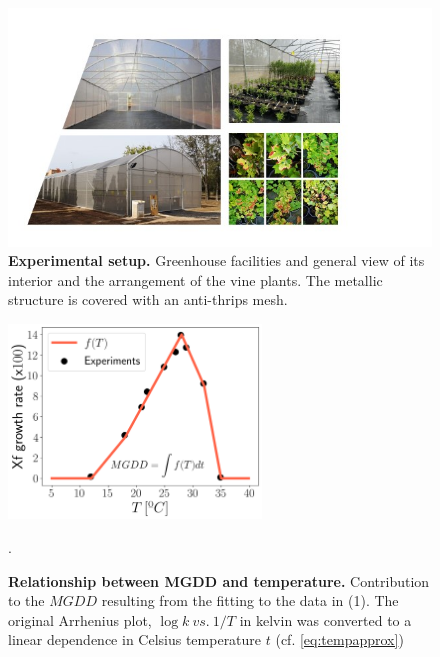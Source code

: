 \begin{figure}[H]
    \centering
    \includegraphics[width=1\textwidth]{Figures/Experimental setup.jpg}
    \caption{\textbf{Experimental setup.} Greenhouse facilities and general
        view of its interior and the arrangement of the vine plants. The
        metallic
        structure is covered with an anti-thrips mesh.}
    \label{fig:experimental_setup} %
\end{figure}

\begin{figure}[H]
    \centering
    \includegraphics[width=0.6\textwidth]{Figures/Climatic_layer_1.png}
    \caption{\textbf{Relationship between MGDD and temperature.}
        Contribution to the $MGDD$ resulting from the fitting to the data in
        (1). The
        original Arrhenius plot, $\log{k} \ vs. \ 1/T$ in kelvin was converted
        to
        a linear dependence in Celsius temperature $t$ (cf.
        \cref{eq:tempapprox})}.
    \label{figS2} %
\end{figure}

